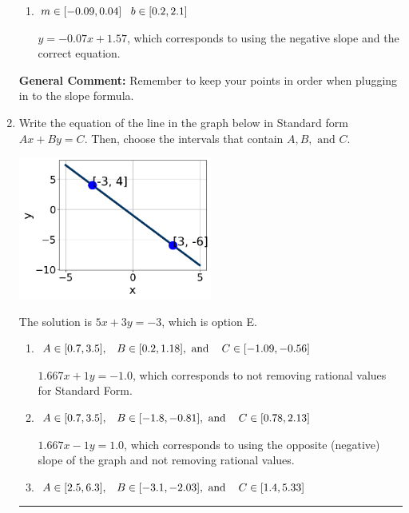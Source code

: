 \documentclass{extbook}[14pt]
\newcommand{\litem}[1]{\item #1

\rule{\textwidth}{0.4pt}}
\begin{document}
\begin{enumerate}
{\begin{enumerate}[label=\Alph*.]
 $y = 0.07x + 8$, which corresponds to using the correct slope/equation but not distributing correctly using the second point.
\item \( m \in [-0.09, 0.04] \hspace*{3mm} b \in [0.2, 2.1] \)

 $y = -0.07x + 1.57$, which corresponds to using the negative slope and the correct equation.
\end{enumerate}

\textbf{General Comment:} Remember to keep your points in order when plugging in to the slope formula.
}
\litem{
Write the equation of the line in the graph below in Standard form $Ax+By=C$. Then, choose the intervals that contain $A, B, \text{ and } C$.

\begin{center}
    \includegraphics[width=0.5\textwidth]{../Figures/linearGraphToStandardCopyA.png}
\end{center}


The solution is \( 5x + 3y = -3 \), which is option E.\begin{enumerate}[label=\Alph*.]
\item \( A \in [0.7, 3.5], \hspace{3mm} B \in [0.2, 1.18], \text{ and } \hspace{3mm} C \in [-1.09, -0.56] \)

 $1.667x + 1y = -1.0$, which corresponds to not removing rational values for Standard Form.
\item \( A \in [0.7, 3.5], \hspace{3mm} B \in [-1.8, -0.81], \text{ and } \hspace{3mm} C \in [0.78, 2.13] \)

 $1.667x - 1y = 1.0$, which corresponds to using the opposite (negative) slope of the graph and not removing rational values.
\item \( A \in [2.5, 6.3], \hspace{3mm} B \in [-3.1, -2.03], \text{ and } \hspace{3mm} C \in [1.4, 5.33] \)


\end{enumerate}}
\end{enumerate}
\end{document}
